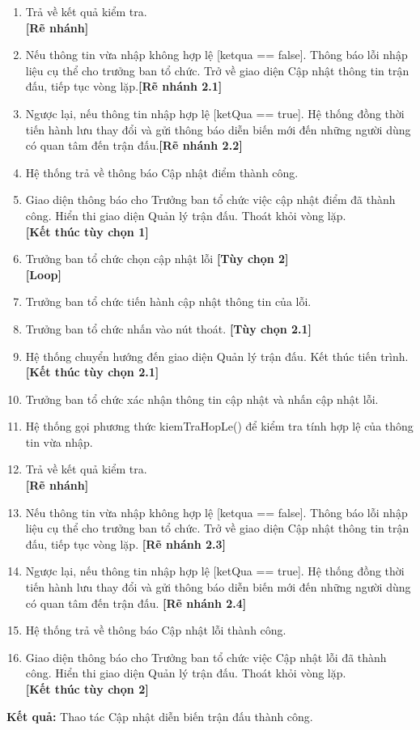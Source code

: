 \begin{enumerate}
      \item Trả về kết quả kiểm tra.\\
            \textbf{[Rẽ nhánh]}
      \item Nếu thông tin vừa nhập không hợp lệ [ketqua == false]. Thông báo lỗi nhập liệu cụ thể cho trưởng ban tổ chức. Trở về giao diện Cập nhật thông tin trận đấu, tiếp tục vòng lặp.\textbf{[Rẽ nhánh 2.1]}
      \item Ngược lại, nếu thông tin nhập hợp lệ [ketQua == true]. Hệ thống đồng thời tiến hành lưu thay đổi và gửi thông báo diễn biến mới đến những người dùng có quan tâm đến trận đấu.\textbf{[Rẽ nhánh 2.2]}
      \item Hệ thống trả về thông báo Cập nhật điểm thành công.
      \item Giao diện thông báo cho Trưởng ban tổ chức việc cập nhật điểm đã thành công. Hiển thi giao diện Quản lý trận đấu. Thoát khỏi vòng lặp.\\
            \textbf{[Kết thúc tùy chọn 1]}
      \item Trưởng ban tổ chức chọn cập nhật lỗi \textbf{[Tùy chọn 2]}\\
            \textbf{[Loop]}
      \item Trưởng ban tổ chức tiến hành cập nhật thông tin của lỗi.
      \item Trưởng ban tổ chức nhấn vào nút thoát. \textbf{[Tùy chọn 2.1]}
      \item Hệ thống chuyển hướng đến giao diện Quản lý trận đấu. Kết thúc tiến trình. \\
            \textbf{[Kết thúc tùy chọn 2.1]}
      \item Trưởng ban tổ chức xác nhận thông tin cập nhật và nhấn cập nhật lỗi.
      \item Hệ thống gọi phương thức kiemTraHopLe() để kiểm tra tính hợp lệ của thông tin vừa nhập.
      \item Trả về kết quả kiểm tra.\\
            \textbf{[Rẽ nhánh]}
      \item Nếu thông tin vừa nhập không hợp lệ [ketqua == false]. Thông báo lỗi nhập liệu cụ thể cho trưởng ban tổ chức. Trở về giao diện Cập nhật thông tin trận đấu, tiếp tục vòng lặp. \textbf{[Rẽ nhánh 2.3]}
      \item Ngược lại, nếu thông tin nhập hợp lệ [ketQua == true]. Hệ thống đồng thời tiến hành lưu thay đổi và gửi thông báo diễn biến mới đến những người dùng có quan tâm đến trận đấu. \textbf{[Rẽ nhánh 2.4]}
      \item Hệ thống trả về thông báo Cập nhật lỗi thành công.
      \item Giao diện thông báo cho Trưởng ban tổ chức việc Cập nhật lỗi đã thành công. Hiển thi giao diện Quản lý trận đấu. Thoát khỏi vòng lặp.\\
            \textbf{[Kết thúc tùy chọn 2]}
\end{enumerate}

\noindent
\textbf{Kết quả:} Thao tác Cập nhật diễn biến trận đấu thành công.

